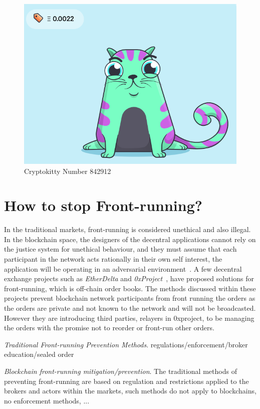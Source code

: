 \begin{figure}[h]
\centering
\includegraphics[width=0.4\linewidth]{figures/cryptokittie842912.png}
\caption{ Cryptokitty Number 842912 \label{fig:cryptokittie}}
\end{figure}







\section{How to stop Front-running?} %

In the traditional markets, front-running is considered unethical and also illegal. In the blockchain space, the designers of the decentral applications cannot rely on the justice system for unethical behaviour, and they must assume that each participant in the network acts rationally in their own self interest, the application will be operating in an adversarial environment~\cite{0xfrontrunning:online}.
A few decentral exchange projects such as \textit{EtherDelta} and \textit{0xProject}~\cite{warren20170x}, have proposed solutions for front-running, which is off-chain order books. The methods discussed within these projects prevent blockchain network participants from front running the orders as the orders are private and not known to the network and will not be broadcasted. However they are introducing third parties, \eg relayers in 0xproject, to be managing the orders with the promise not to reorder or front-run other orders. 

\emph{Traditional Front-running Prevention Methods}. regulations/enforcement/broker education/sealed order


\emph{Blockchain front-running mitigation/prevention}. The traditional methods of preventing front-running are based on regulation and restrictions applied to the brokers and actors within the markets, such methods do not apply to blockchains, no enforcement methods, ... 

